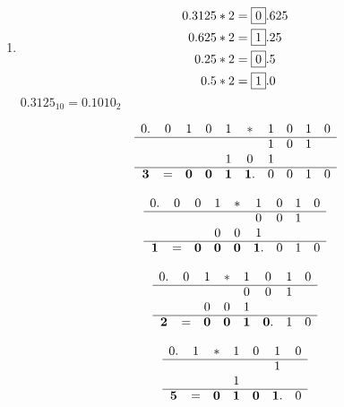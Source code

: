 \documentclass{article}
\begin{document}
\begin{enumerate}[a)]
\begin{enumerate}[1)]
  \newpage
  \item
    \begin{align*}
      0.3125 * 2 &= \framebox{0}.625 \\
      0.625  * 2 &= \framebox{1}.25 \\
      0.25   * 2 &= \framebox{0}.5 \\
      0.5    * 2 &= \framebox{1}.0 \\
    \end{align*}
    $0.3125_{10} = 0.1010_{2}$
    
    \[
      \begin{array}{cccc cccc cc}
        0.&0&1&0&1&*&1&0&1&0 \\
        \cline{0-9}
          & & & & & &1&0&1 \\
          & & & &1&0&1 \\
        \cline{0-9}
        \bm{3}&=&\bm{0}&\bm{0}&\bm{1}&\bm{1}.&0&0&1&0 \\
      \end{array}
    \]

    \[
      \begin{array}{cccc cccc c}
        0.&0&0&1&*&1&0&1&0 \\
        \cline{0-8}
          & & & & &0&0&1 \\
          & & &0&0&1 \\
        \cline{0-8}
        \bm{1}&=&\bm{0}&\bm{0}&\bm{0}&\bm{1}.&0&1&0 \\
      \end{array}
    \]

    \[
      \begin{array}{cccc cccc}
        0.&0&1&*&1&0&1&0 \\
        \cline{0-7}
          & & & &0&0&1 \\
          & &0&0&1 \\
        \cline{0-7}
        \bm{2}&=&\bm{0}&\bm{0}&\bm{1}&\bm{0}.&1&0 \\
      \end{array}
    \]

    \[
      \begin{array}{cccc ccc}
        0.&1&*&1&0&1&0 \\
        \cline{0-6}
          & & & & &1 \\
          & & &1 \\
        \cline{0-6}
        \bm{5}&=&\bm{0}&\bm{1}&\bm{0}&\bm{1}.&0 \\
      \end{array}
    \]


\end{enumerate}
\end{enumerate}
\end{document}
